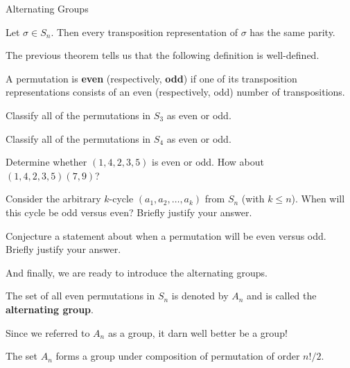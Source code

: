 \begin{section}{Alternating Groups}
\begin{theorem}
Let $\sigma\in S_n$.  Then every transposition representation of $\sigma$ has the same parity.
\end{theorem}

The previous theorem tells us that the following definition is well-defined.

\begin{definition}
A permutation is \textbf{even} (respectively, \textbf{odd}) if one of its transposition representations consists of an even (respectively, odd) number of transpositions.
\end{definition}

\begin{exercise}
Classify all of the permutations in $S_3$ as even or odd.
\end{exercise}

\begin{exercise}
Classify all of the permutations in $S_4$ as even or odd.
\end{exercise}

\begin{exercise}
Determine whether $(1,4,2,3,5)$ is even or odd.  How about $(1,4,2,3,5)(7,9)$?
\end{exercise}

\begin{problem}
Consider the arbitrary $k$-cycle $(a_1,a_2,\ldots, a_k)$ from $S_n$ (with $k\leq n$).  When will this cycle be odd versus even?  Briefly justify your answer. 
\end{problem}

\begin{problem}
Conjecture a statement about when a permutation will be even versus odd.  Briefly justify your answer.
\end{problem}

And finally, we are ready to introduce the alternating groups.

\begin{definition}
The set of all even permutations in $S_n$ is denoted by $A_n$ and is called the \textbf{alternating group}.
\end{definition}

Since we referred to $A_n$ as a group, it darn well better be a group!

\begin{theorem}
The set $A_n$ forms a group under composition of permutation of order $n!/2$.
\end{theorem}


\end{section}
